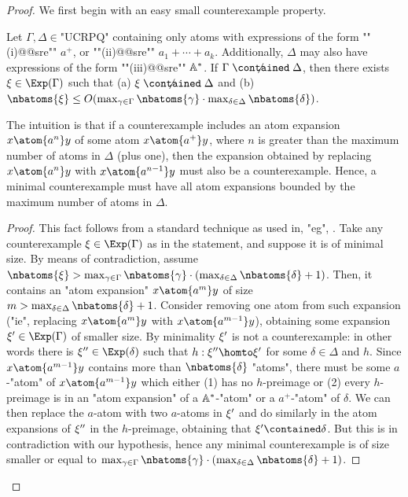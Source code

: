 \begin{proof}
	We first begin with an easy small counterexample property.
	\begin{claim}
		\AP\label{cl:small-counterexample-SRE}
		Let $\Gamma, \Delta \in \text{"UCRPQ"}$ containing only atoms with expressions of the form \AP""(i)@@sre"" $a^+$, or ""(ii)@@sre"" $a_1 + \dotsb + a_k$. Additionally, $\Delta$ may also have expressions of the form ""(iii)@@sre"" $\mathbb{A}^*$. If $\Gamma \centernot{\contained} \Delta$, then there exists $\anexpansion \in \Exp(\Gamma)$ such that (a) $\anexpansion \centernot{\contained} \Delta$ and (b) $\nbatoms{\anexpansion} \leq O(\max_{\gamma \in \Gamma}\nbatoms{\gamma} \cdot \max_{\delta \in \Delta}\nbatoms{\delta})$.
	\end{claim}

	The intuition is that if a counterexample includes an atom expansion $x \atom{a^n} y$ of some atom $x \atom{a^+} y$, where $n$ is greater than the maximum number of atoms in $\Delta$ (plus one), then the expansion obtained by replacing $x \atom{a^n} y$ with $x \atom{a^{n-1}} y$ must also be a counterexample. Hence, a minimal counterexample must have all atom expansions bounded by the maximum number of atoms in $\Delta$.

	\begin{proof}
		This fact follows from a standard technique as used in, "eg", \cite{FigueiraEtal2020Containment}.
		Take any counterexample $\anexpansion \in \Exp(\Gamma)$ as in the statement, and suppose it is of minimal size. By means of contradiction, assume $\nbatoms{\anexpansion} > \max_{\gamma \in \Gamma}\nbatoms{\gamma} \cdot (\max_{\delta \in \Delta}\nbatoms{\delta}+1)$. 
		Then, it contains an "atom expansion" $x \atom{a^m} y$ of size $m>\max_{\delta \in \Delta}\nbatoms{\delta}+1$. 
		Consider removing one atom from such expansion ("ie", replacing $x \atom{a^m} y$ with $x \atom{a^{m-1}} y$), obtaining some expansion $\anexpansion' \in \Exp(\Gamma)$ of smaller size. By minimality $\xi'$ is not a counterexample: in other words there is  $\anexpansion'' \in \Exp(\delta)$ such that $h:\anexpansion'' \homto \anexpansion'$ for some $\delta \in \Delta$ and $h$. Since $x \atom{a^{m-1}} y$ contains more than $\nbatoms{\delta}$ "atoms", there must be some $a$-"atom" of $x \atom{a^{m-1}} y$ which either (1) has no $h$-preimage or (2) every $h$-preimage is in an "atom expansion" of a $\mathbb{A}^*$-"atom" or a $a^+$-"atom" of $\delta$. We can then replace the $a$-atom with two $a$-atoms in $\xi'$ and do similarly in the atom expansions of $\xi''$ in the $h$-preimage, obtaining that $\anexpansion' \contained \delta$. But this is in contradiction with our hypothesis, hence any minimal counterexample is of size smaller or equal to $\max_{\gamma \in \Gamma}\nbatoms{\gamma} \cdot (\max_{\delta \in \Delta}\nbatoms{\delta}+1)$.
	\end{proof}
	

\end{proof}
